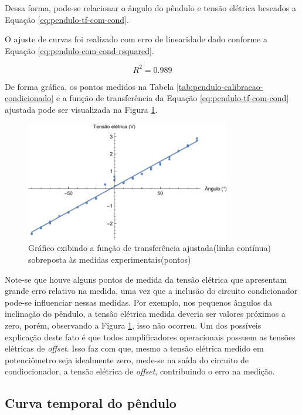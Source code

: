 \documentclass[a4paper]{instrumentacao}
\begin{document}
Dessa forma, pode-se relacionar o ângulo do pêndulo e tensão elétrica beseados a Equação \ref{eq:pendulo-tf-com-cond}.

O ajuste de curvas foi realizado com erro de linearidade dado conforme a Equação \ref{eq:pendulo-com-cond-rsquared}.

\begin{equation}
	R^2 = 0.989
	\label{eq:pendulo-com-cond-rsquared}
\end{equation}

De forma gráfica, os pontos medidos na Tabela \ref{tab:pendulo-calibracao-condicionado} e a função de transferência da Equação \ref{eq:pendulo-tf-com-cond} ajustada pode ser visualizada na Figura \ref{fig:pendulo-tf-com-cond}.

\begin{figure}[H]
\centering
\includegraphics[width=0.8\textwidth]{Pendulo-Condicionado-fit.pdf}
\caption{Gráfico exibindo a função de transferência ajustada(linha contínua) sobreposta às medidas experimentais(pontos)}
\label{fig:pendulo-tf-com-cond}
\end{figure}

Note-se que houve alguns pontos de medida da tensão elétrica que apresentam grande erro relativo na medida, uma vez que a inclusão do circuito condicionador pode-se influenciar nessas medidas. Por exemplo, nos pequenos ângulos da inclinação do pêndulo, a tensâo elétrica medida deveria ser valores próximos a zero, porém, observando a Figura \ref{fig:pendulo-tf-com-cond}, isso não ocorreu. Um dos possíveis explicação deste fato é que todos amplificadores operacionais possuem as tensões elétricas de \textit{offset}. Isso faz com que, mesmo a tensão elétrica medido em potenciômetro seja idealmente zero, mede-se na saída do circuito de condiocionador, a tensão elétrica de \textit{offset}, contribuindo o erro na medição.  

\subsection{Curva temporal do pêndulo}
\end{document}
